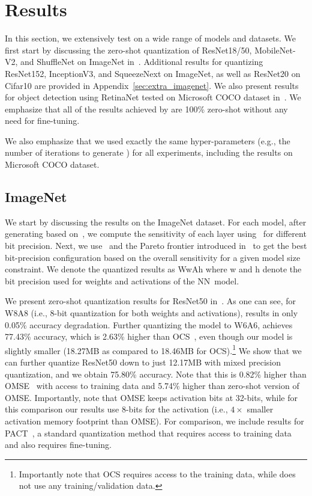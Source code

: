 \section{Results}\label{sec:results}
In this section, we extensively test \OURS on a wide range of models and datasets.
We first start by discussing the zero-shot quantization of ResNet18/50, MobileNet-V2, and ShuffleNet on ImageNet in~. 
Additional results for quantizing ResNet152, InceptionV3, and SqueezeNext on ImageNet, as well as ResNet20 on Cifar10 are provided in Appendix~\ref{sec:extra_imagenet}. 
We also present results for object detection using RetinaNet tested on Microsoft COCO dataset in~. 
We emphasize that all of the results achieved by \OURS are 100\% zero-shot without any need for fine-tuning. 


We also emphasize that we used exactly the same
hyper-parameters (e.g., the number of iterations to generate \rg) for all experiments, including the results on Microsoft COCO dataset.



\subsection{ImageNet}\label{sec:imagenet_result}
We start by discussing the results on the ImageNet dataset.
For each model, after generating \rg based on~, we compute the sensitivity of each layer using~ for different bit precision.
Next, we use~ and the Pareto frontier introduced in~ to get the best bit-precision configuration based on the overall sensitivity for a given model size constraint. 
We denote the quantized results as WwAh where w and h denote the bit precision used for weights and
activations of the NN~model.

We present zero-shot quantization results for ResNet50 in~.
As one can see, for W8A8 (i.e., 8-bit quantization for both weights and
activations), \OURS results in only 0.05\% accuracy degradation.
Further quantizing the model to W6A6, \OURS achieves 77.43\% accuracy, which is 
2.63\% higher than OCS~\cite{zhao2019improving}, even though our model is slightly smaller (18.27MB as compared to 18.46MB for OCS).\footnote{Importantly note that OCS requires access to the training data, while \OURS does not use any training/validation data.}
We show that we can further quantize ResNet50 down to just 12.17MB with mixed precision quantization, 
and we obtain 75.80\% accuracy. Note that this is 0.82\% higher than OMSE~\cite{Kravchik_2019_ICCV} with access to training data and 5.74\% higher than zero-shot version of OMSE. Importantly, note that OMSE keeps
activation bits at 32-bits, while for this comparison our results use 8-bits for the activation (i.e., $4\times$ smaller activation memory footprint than OMSE).
For comparison, we include results for PACT~\cite{choi2018pact}, a standard quantization method that requires access to training data and also requires fine-tuning. 


